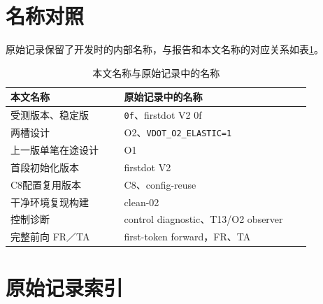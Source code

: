 \appendix
\section{名称对照}

原始记录保留了开发时的内部名称，与报告和本文名称的对应关系如表\ref{tab:names}。

\begin{table}[!htbp]\centering\small
\caption{本文名称与原始记录中的名称}\label{tab:names}
\begin{tabular}{p{0.34\linewidth}p{0.56\linewidth}}
\toprule
本文名称 & 原始记录中的名称\\
\midrule
受测版本、稳定版 & \texttt{0f}、firstdot V2 0f\\
两槽设计 & O2、\texttt{VDOT\_O2\_ELASTIC=1}\\
上一版单笔在途设计 & O1\\
首段初始化版本 & firstdot V2\\
C8配置复用版本 & C8、config-reuse\\
干净环境复现构建 & clean-02\\
控制诊断 & control diagnostic、T13/O2 observer\\
完整前向 FR／TA & first-token forward，FR、TA\\
\bottomrule
\end{tabular}
\end{table}

\section{原始记录索引}

